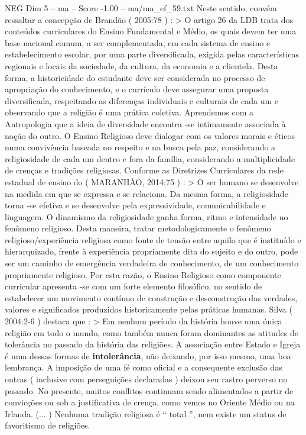 \begin{textsample}{NEG Dim 5 – ma – Score -1.00 – ma/ma\_ef\_59.txt}
Neste sentido, convém ressaltar a concepção de Brandão ( 2005:78 ) : > O artigo 26 da LDB trata dos conteúdos curriculares do Ensino Fundamental e Médio, os quais devem ter uma base nacional comum, a ser complementada, em cada sistema de ensino e estabelecimento escolar, por uma parte diversificada, exigida pelas características regionais e locais da sociedade, da cultura, da economia e a clientela.
Desta forma, a historicidade do estudante deve ser considerada no processo de apropriação do conhecimento, e o currículo deve assegurar uma proposta diversificada, respeitando as diferenças individuais e culturais de cada um e observando que a religião é uma prática coletiva.
Aprendemos com a Antropologia que a ideia de diversidade encontra -se intimamente associada à noção do outro.
O Ensino Religioso deve dialogar com os valores morais e éticos numa convivência baseada no respeito e na busca pela paz, considerando a religiosidade de cada um dentro e fora da família, considerando a multiplicidade de crenças e tradições religiosas.
Conforme as Diretrizes Curriculares da rede estadual de ensino do ( MARANHÃO, 2014:75 ) : > O ser humano se desenvolve na medida em que se expressa e se relaciona.
Da mesma forma, a religiosidade torna -se efetiva e se desenvolve pela expressividade, comunicabilidade e linguagem.
O dinamismo da religiosidade ganha forma, ritmo e intensidade no fenômeno religioso.
Desta maneira, tratar metodologicamente o fenômeno religioso/experiência religiosa como fonte de tensão entre aquilo que é instituído e hierarquizado, frente à experiência propriamente dita do sujeito e do outro, pode ser um caminho de emergência verdadeira de conhecimento, de um conhecimento propriamente religioso.
Por esta razão, o Ensino Religioso como componente curricular apresenta -se com um forte elemento filosófico, no sentido de estabelecer um movimento contínuo de construção e desconstrução das verdades, valores e significados produzidos historicamente pelas práticas humanas.
Silva ( 2004:2-6 ) destaca que : > Em nenhum período da história houve uma única religião em todo o mundo, como também nunca foram dominantes as atitudes de tolerância no passado da história das religiões.
A associação entre Estado e Igreja é uma dessas formas de \textbf{intolerância}, não deixando, por isso mesmo, uma boa lembrança.
A imposição de uma fé como oficial e a consequente exclusão das outras ( inclusive com perseguições declaradas ) deixou seu rastro perverso no passado.
No presente, muitos conflitos continuam sendo alimentados a partir de convicções ou sob a justificativa de crença, como vemos no Oriente Médio ou na Irlanda. (... ) Nenhuma tradição religiosa é “ total ”, nem existe um status de favoritismo de religiões.

\end{textsample}
